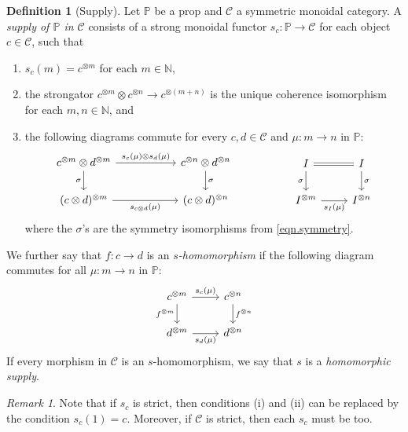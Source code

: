 \documentclass[11pt, oneside, article]{memoir}
\theoremstyle{plain}
\theoremstyle{definition}
\newtheorem{definition}[theorem]{Definition}
\theoremstyle{remark}
\newtheorem{remark}[theorem]{Remark}
\newcommand{\cat}[1]{\mathcal{#1}}%
\newcommand{\tpow}[1]{^{\otimes #1}}
\newcommand{\nn}{\mathbb{N}}
\newcommand{\pp}{\mathbb{P}}
\begin{document}
\begin{definition}[Supply]\label{def.supply}
Let $\pp$ be a prop and $\cat{C}$ a symmetric monoidal category. A \emph{supply of $\pp$ in $\cat{C}$} consists of a strong monoidal functor $s_c\colon\pp\to\cat{C}$ for each object $c\in\cat{C}$, such that
\begin{enumerate}[label=(\roman*)]
	\item $s_c(m)=c\tpow{m}$ for each $m\in\nn$, 
	\item the strongator $c\tpow{m}\otimes c\tpow{n}\to c\tpow{(m+n)}$ is the unique coherence isomorphism for each $m,n\in\nn$, and
	\item the following diagrams commute for every $c,d\in\cat{C}$ and $\mu\colon m\to n$ in $\pp$:
\begin{equation}\label{eqn.supply_commute_tensors}
\begin{tikzcd}[column sep=55pt]
	c\tpow{m}\otimes d\tpow{m}\ar[r, "s_c(\mu)\otimes s_d(\mu)"]\ar[d, "\sigma"']&
	c\tpow{n}\otimes d\tpow{n}\ar[d, "\sigma"]\\
	(c\otimes d)\tpow{m}\ar[r, "s_{c\otimes d}(\mu)"']&
	(c\otimes d)\tpow{n}
\end{tikzcd}
\hspace{.7in}
\begin{tikzcd}
	I\ar[r, equal]\ar[d, "\sigma"']&
	I\ar[d, "\sigma"]\\
	I\tpow{m}\ar[r, "s_I(\mu)"']&
	I\tpow{n}
\end{tikzcd}
\end{equation}
where the $\sigma$'s are the symmetry isomorphisms from \cref{eqn.symmetry}.
\end{enumerate}
We further say that $f\colon c\to d$ is an \emph{$s$-homomorphism} if the following diagram commutes for all $\mu\colon m\to n$ in $\pp$:
\begin{equation}\label{eqn.nat_means_homo}
\begin{tikzcd}
	c\tpow{m}\ar[r, "s_c(\mu)"]\ar[d, "f\tpow{m}"']&
	c\tpow{n}\ar[d, "f\tpow{n}"]\\
	d\tpow{m}\ar[r, "s_d(\mu)"']&
	d\tpow{n}
\end{tikzcd}
\end{equation}
If every morphism in $\cat{C}$ is an $s$-homomorphism, we say that $s$ is a \emph{homomorphic supply}.
\end{definition}

\begin{remark}\label{rem.strict}
Note that if $s_c$ is strict, then conditions (i) and (ii) can be replaced by the condition $s_c(1)=c$. Moreover, if $\cat{C}$ is strict, then each $s_c$ must be too.
\end{remark}
\end{document}
